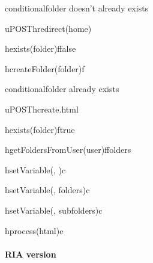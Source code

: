 \documentclass[a4paper, dvipsnames]{article}
\begin{document}
	\begin{center}
		\begin{sequencediagram}
			
			\begin{sdblock}{conditional}{folder doesn't already exists}
				\begin{call}{u}{POST}{h}{redirect(home)}
					\begin{call}{h}{exists(folder)}{f}{false}
					\end{call}
					\begin{call}{h}{createFolder(folder)}{f}{}
					\end{call}
				\end{call}
			\end{sdblock}
			\begin{sdblock}{conditional}{folder already exists}
				\begin{call}{u}{POST}{h}{create.html}
					\begin{call}{h}{exists(folder)}{f}{true}
					\end{call}
					\begin{call}{h}{getFoldersFromUser(user)}{f}{folders}
					\end{call}
					\begin{call}{h}{setVariable(, )}{c}{}
					\end{call}
					\begin{call}{h}{setVariable(, folders)}{c}{}
					\end{call}
					\begin{call}{h}{setVariable(, subfolders)}{c}{}
					\end{call}
					\begin{call}{h}{process(html)}{e}{}
					\end{call}
				\end{call}
			\end{sdblock}
		\end{sequencediagram}
	\end{center}
	
	\pagebreak
	
	\paragraph{RIA version}
	
\end{document}
